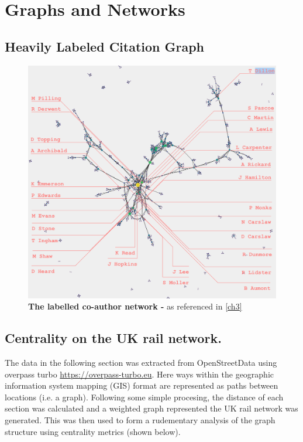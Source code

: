 \chapter{Graphs and Networks}


\section{Heavily Labeled Citation Graph}\label{appendix:fullauthor}

\begin{figure}[H]
     \centering
         \includegraphics[width=\textwidth]{WACLauthor.png}
        \caption{ \textbf{The labelled co-author network -} as  referenced in \autoref{ch3} }
        
\end{figure}
\newpage


\section{Centrality on the UK rail network.}\label{appendix:rail}

The data in the following section was extracted from OpenStreetData using overpass turbo \url{https://overpass-turbo.eu}. Here ways within the geographic information system mapping (GIS) format are represented as paths between locations (i.e. a graph). Following some simple procesing, the distance of each section was calculated and a weighted graph represented the UK rail network was generated. This was then used to form a rudementary analysis of the graph structure using centrality metrics (shown below). 

